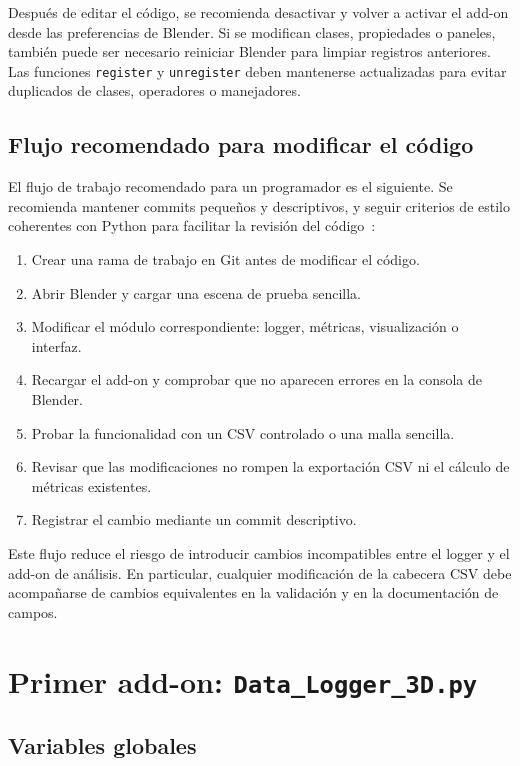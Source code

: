Después de editar el código, se recomienda desactivar y volver a activar el add-on desde las preferencias de Blender. Si se modifican clases, propiedades o paneles, también puede ser necesario reiniciar Blender para limpiar registros anteriores. Las funciones \texttt{register} y \texttt{unregister} deben mantenerse actualizadas para evitar duplicados de clases, operadores o manejadores.

\subsection{Flujo recomendado para modificar el código}
\label{subsec:d-flujo-modificacion}

El flujo de trabajo recomendado para un programador es el siguiente. Se recomienda mantener commits pequeños y descriptivos, y seguir criterios de estilo coherentes con Python para facilitar la revisión del código~\cite{github,pep8}:

\begin{enumerate}
    \item Crear una rama de trabajo en Git antes de modificar el código.
    \item Abrir Blender y cargar una escena de prueba sencilla.
    \item Modificar el módulo correspondiente: logger, métricas, visualización o interfaz.
    \item Recargar el add-on y comprobar que no aparecen errores en la consola de Blender.
    \item Probar la funcionalidad con un CSV controlado o una malla sencilla.
    \item Revisar que las modificaciones no rompen la exportación CSV ni el cálculo de métricas existentes.
    \item Registrar el cambio mediante un commit descriptivo.
\end{enumerate}

Este flujo reduce el riesgo de introducir cambios incompatibles entre el logger y el add-on de análisis. En particular, cualquier modificación de la cabecera CSV debe acompañarse de cambios equivalentes en la validación y en la documentación de campos.

\section{Primer add-on: \texttt{Data\_Logger\_3D.py}}
\label{sec:d-logger}

\subsection{Variables globales}
\label{subsec:d-logger-globales}

